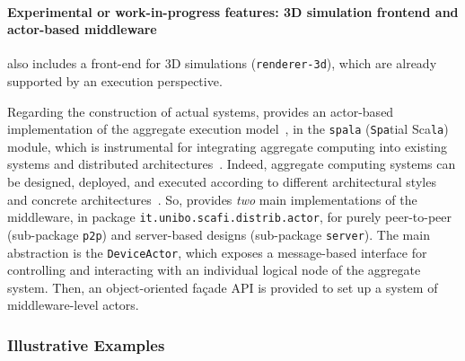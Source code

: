 \paragraph*{Experimental or work-in-progress features: 3D simulation frontend and actor-based middleware}
%
\scafi{} also includes a front-end for 3D simulations (\texttt{renderer-3d}), 
 which are already supported by an execution perspective.

Regarding the construction of actual systems, 
 \scafi{}
 provides
 an actor-based implementation
 of the aggregate execution model~\cite{DBLP:series/lncs/CasadeiV18},
 in the \texttt{spala} (\texttt{Spa}tial Sca\texttt{la}) module,
 which is instrumental for integrating aggregate computing
 into existing systems and distributed architectures~\cite{DBLP:series/lncs/CasadeiV18}.
%
Indeed, aggregate computing systems
 can be designed, deployed, and executed 
 according to different
 architectural styles 
 and concrete architectures~\cite{DBLP:journals/fi/CasadeiPPVW20}.
%
So, \scafi{} provides \emph{two} main implementations of the middleware,
 in package \texttt{it.unibo.scafi.distrib.actor},
 for purely peer-to-peer 
 (sub-package \texttt{p2p})
 and server-based designs
 (sub-package \texttt{server}).
%
The main abstraction
 is the \texttt{DeviceActor},
 which exposes a message-based interface
 for controlling and interacting with
 an individual logical node of the aggregate system.
%
Then, an object-oriented façade API is provided to set up a system of middleware-level actors. 


\subsubsection{Illustrative Examples}
\label{sec:examples}
